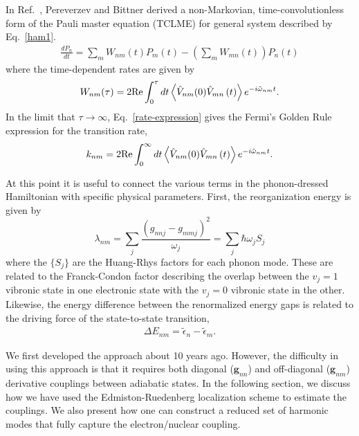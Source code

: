 In Ref.~\cite{pereverzev2006time}, Pereverzev and Bittner derived
a non-Markovian, time-convolutionless form of the Pauli master
equation (TCLME)  for general system described by Eq.~\ref{ham1}.
\begin{eqnarray}
\frac{dP_{n}}{dt} = \sum_{m} W_{nm}(t)P_{m}(t) - \left(\sum_{m} W_{mn}(t)\right)P_{n}(t)
\end{eqnarray}
where the time-dependent rates are given by
\begin{eqnarray}
W_{nm}(\tau)=2{\rm Re}\int_{0}^{\tau}dt\left\langle \hat V_{nm}(0)\hat V_{mn}\left(t\right)\right\rangle e^{-i\tilde\omega_{nm}t}.
\label{rate-expression}
\end{eqnarray}
In the limit that $\tau\to\infty$, Eq.~\ref{rate-expression} gives the Fermi's Golden Rule expression for the
transition rate,
\begin{eqnarray}
k_{nm}=2{\rm Re}\int_{0}^{\infty}dt\left\langle \hat V_{nm}(0)\hat V_{mn}\left(t\right)\right\rangle e^{-i\tilde\omega_{nm}t}.
\label{gr-expression}
\end{eqnarray}

At this point it is useful to connect the various terms in the phonon-dressed Hamiltonian
with specific physical parameters.
First, the reorganization energy is given by
\[
\lambda_{nm}=\sum_{j}\frac{\left(g_{nnj}-g_{mmj}\right)^{2}}{\omega_{j}} = \sum_{j}\hbar \omega_{j}S_{j}
\]
where  the $\{S_{j}\}$  are  the Huang-Rhys factors for each phonon mode.
These are related to the Franck-Condon factor
describing the overlap between the $v_j=1$ vibronic state in one electronic state
with the $v_j=0$ vibronic state in the other.
Likewise, the energy difference between the renormalized energy gaps is related to the
driving force of the state-to-state transition,
\begin{eqnarray}
\Delta E_{nm} = \tilde \epsilon_n-\tilde \epsilon_m.
\end{eqnarray}


We first developed the approach about 10 years ago. However, the difficulty in using this approach is that
it requires both diagonal (${\mathbf g}_{nn}$) and off-diagonal  (${\mathbf g}_{nm}$) derivative couplings between
adiabatic states.    In the following section, we discuss how we have used the Edmiston-Ruedenberg localization scheme
to estimate the couplings\cite{edmiston1963localized}.   We also
present how one can construct a reduced set of harmonic modes that
fully capture the electron/nuclear coupling.
